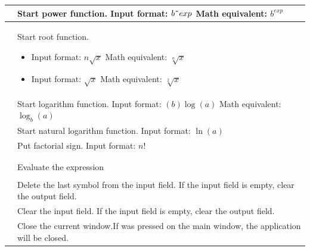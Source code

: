 \documentclass[a5paper, 10pt]{article}
\makeatletter
\def\setmenukeyswin{\def\tw@mk@os{win}}
\makeatother
\begin{document}
\begin{xltabular}{\textwidth}{
            >{\setmenukeyswin}c @{\hspace{3em}}
            >{\renewcommand\cellalign{cl}}X}
            \keys{\^{}} & Start power function. \newline Input format: $b\texttt{\^{}}exp$ \newline Math equivalent: $b^{exp}$
            \\* \midrule

             & Start root function.
            \begin{itemize}[leftmargin=*]
                \item  Input format: $n \sqrt x$ \newline Math equivalent: $\sqrt[n]{x}$
                \item  Input format: $\sqrt x$ \newline Math equivalent: $\sqrt[2]{x}$
            \end{itemize}
            \\* \midrule

             & Start logarithm function. \newline Input format: $(b)\log(a)$ \newline Math equivalent: $\log_b(a)$
            \\* \midrule

             & Start natural logarithm function. \newline Input format: $\ln(a)$
            \\* \midrule

            \keys{!} & Put factorial sign. \newline Input format: $n!$
            \\* \midrule

            \\* \midrule

             & Evaluate the expression
            \\*
            \midrule

             & Delete the last symbol from the input field. \newline If the input field is empty, clear the output field.
            \\*
            \midrule

             & Clear the input field. \newline If the input field is empty, clear the output field.
            \\* \midrule

            \keys{\esc} & Close the current window.\newline If was pressed on the main window, the application will be closed.
            \\*
        \end{xltabular}
\end{document}

